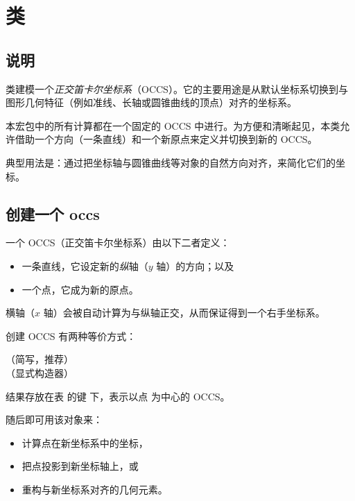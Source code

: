 \newpage
\section{ 类}
\label{sec:orthonormal_cartesian_coordinate_system}

\subsection{说明}
 类建模一个\emph{正交笛卡尔坐标系}（OCCS）。它的主要用途是从默认坐标系切换到与图形几何特征（例如准线、长轴或圆锥曲线的顶点）对齐的坐标系。

本宏包中的所有计算都在一个固定的 OCCS 中进行。为方便和清晰起见，本类允许借助一个方向（一条直线）和一个新原点来定义并切换到新的 OCCS。

\medskip

典型用法是：通过把坐标轴与圆锥曲线等对象的自然方向对齐，来简化它们的坐标。

\subsection{创建一个 occs}\label{occs:create}

一个 OCCS（正交笛卡尔坐标系）由以下二者定义：
\begin{itemize}
  \item 一条直线，它设定新的\emph{纵}轴（$y$ 轴）的方向；以及
  \item 一个点，它成为新的原点。
\end{itemize}

横轴（$x$ 轴）会被自动计算为与纵轴正交，从而保证得到一个右手坐标系。

\medskip

创建 OCCS 有两种等价方式：

\begin{mybox}
   \hfill（简写，推荐）
  \\
   \hfill（显式构造器）
\end{mybox}

结果存放在表  的键  下，表示以点  为中心的 OCCS。

\medskip

随后即可用该对象来：
\begin{itemize}
  \item 计算点在新坐标系中的坐标，
  \item 把点投影到新坐标轴上，或
  \item 重构与新坐标系对齐的几何元素。
\end{itemize}


